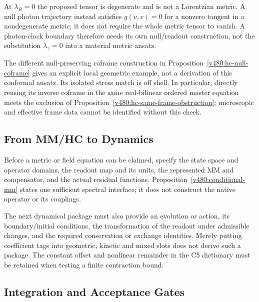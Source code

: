 At $\lambda_R=0$ the proposed tensor is degenerate and is not a
Lorentzian metric. A null photon trajectory instead satisfies
$g(v,v)=0$ for a nonzero tangent in a nondegenerate metric; it does
not require the whole metric tensor to vanish. A photon-clock
boundary therefore needs its own null/readout construction, not
the substitution $\lambda_\gamma=0$ into a material metric ansatz.

The different null-preserving coframe construction in
Proposition~\ref{v480:hc-null-coframe} gives an explicit local geometric
example, not a derivation of this conformal ansatz. Its isolated stress
match is off shell. In particular, directly reusing its inverse coframe
in the same real-bilinear ordered master equation meets the exclusion
of Proposition~\ref{v480:hc-same-frame-obstruction}; microscopic and
effective frame data cannot be identified without this check.

\subsection{From MM/HC to Dynamics}
\label{v480:dynamics-handoff}

Before a metric or field equation can be claimed, specify the
state space and operator domains, the readout map and its units,
the represented MM and compensator, and the actual residual
functions. Proposition~\ref{v480:conditional-mm} states one
sufficient spectral interface; it does not construct the native
operator or its couplings.

The next dynamical package must also provide an evolution or action,
its boundary/initial conditions, the transformation of the readout
under admissible changes, and the required conservation or exchange
identities. Merely putting coefficient tags into geometric,
kinetic and mixed slots does not derive such a package.
The constant offset and nonlinear remainder in the C5 dictionary
must be retained when testing a finite contraction bound.

\subsection{Integration and Acceptance Gates}

